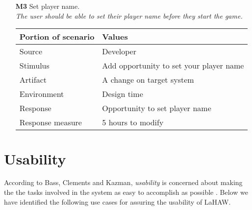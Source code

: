 \begin{itemize}
        \item[\textbf{M3}] Set player name. \\
        \textit{\small{The user should be able to set their player name before they start the game.}}
        
        \begin{tabular}{| l | l |}
            \hline
            \rowcolor[gray]{0.8}
            \textbf{Portion of scenario} & \textbf{Values} \\
            \hline
            Source & Developer \\
            Stimulus & Add opportunity to set your player name \\
            Artifact & A change on target system \\
            Environment & Design time \\
            Response & Opportunity to set player name  \\
            Response measure & 5 hours to modify \\
            \hline
        \end{tabular}
    \end{itemize}



\section{Usability}
According to Bass, Clements and Kazman, \emph{usability} is concerned about making the the tasks involved in the system as easy to accomplish as possible \cite[p.~90]{pensum}. Below we have identified the following use cases for assuring the usability of LaHAW.

